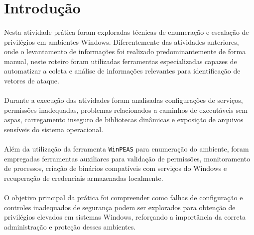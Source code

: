 \section{Introdução}

\paragraph{}
Nesta atividade prática foram exploradas técnicas de enumeração e escalação de
privilégios em ambientes Windows. Diferentemente das atividades anteriores,
onde o levantamento de informações foi realizado predominantemente de forma
manual, neste roteiro foram utilizadas ferramentas especializadas capazes de
automatizar a coleta e análise de informações relevantes para identificação de
vetores de ataque.

\paragraph{}
Durante a execução das atividades foram analisadas configurações de serviços,
permissões inadequadas, problemas relacionados a caminhos de executáveis sem
aspas, carregamento inseguro de bibliotecas dinâmicas e exposição de arquivos
sensíveis do sistema operacional.

\paragraph{}
Além da utilização da ferramenta \texttt{WinPEAS} para enumeração do ambiente,
foram empregadas ferramentas auxiliares para validação de permissões,
monitoramento de processos, criação de binários compatíveis com serviços do
Windows e recuperação de credenciais armazenadas localmente.

\paragraph{}
O objetivo principal da prática foi compreender como falhas de configuração e
controles inadequados de segurança podem ser explorados para obtenção de
privilégios elevados em sistemas Windows, reforçando a importância da correta
administração e proteção desses ambientes.
